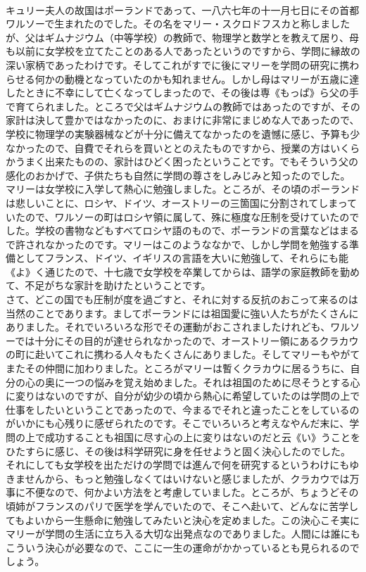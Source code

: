 \documentclass[8pt]{extreport}
\begin{document}
\begin{CJK}{UTF8}{min}
\\	キュリー夫人の故国はポーランドであって、一八六七年の十一月七日にその首都ワルソーで生まれたのでした。その名をマリー・スクロドフスカと称しましたが、父はギムナジウム（中等学校）の教師で、物理学と数学とを教えて居り、母も以前に女学校を立てたことのある人であったというのですから、学問に縁故の深い家柄であったわけです。そしてこれがすでに後にマリーを学問の研究に携わらせる何かの動機となっていたのかも知れません。しかし母はマリーが五歳に達したときに不幸にして亡くなってしまったので、その後は専《もっぱ》ら父の手で育てられました。ところで父はギムナジウムの教師ではあったのですが、その家計は決して豊かではなかったのに、おまけに非常にまじめな人であったので、学校に物理学の実験器械などが十分に備えてなかったのを遺憾に感じ、予算も少なかったので、自費でそれらを買いととのえたものですから、授業の方はいくらかうまく出来たものの、家計はひどく困ったということです。でもそういう父の感化のおかげで、子供たちも自然に学問の尊さをしみじみと知ったのでした。
\\	マリーは女学校に入学して熱心に勉強しました。ところが、その頃のポーランドは悲しいことに、ロシヤ、ドイツ、オーストリーの三箇国に分割されてしまっていたので、ワルソーの町はロシヤ領に属して、殊に極度な圧制を受けていたのでした。学校の書物などもすべてロシヤ語のもので、ポーランドの言葉などはまるで許されなかったのです。マリーはこのようななかで、しかし学問を勉強する準備としてフランス、ドイツ、イギリスの言語を大いに勉強して、それらにも能《よ》く通じたので、十七歳で女学校を卒業してからは、語学の家庭教師を勤めて、不足がちな家計を助けたということです。
\\	さて、どこの国でも圧制が度を過ごすと、それに対する反抗のおこって来るのは当然のことであります。ましてポーランドには祖国愛に強い人たちがたくさんにありました。それでいろいろな形でその運動がおこされましたけれども、ワルソーでは十分にその目的が達せられなかったので、オーストリー領にあるクラカウの町に赴いてこれに携わる人々もたくさんにありました。そしてマリーもやがてまたその仲間に加わりました。ところがマリーは暫くクラカウに居るうちに、自分の心の奥に一つの悩みを覚え始めました。それは祖国のために尽そうとする心に変りはないのですが、自分が幼少の頃から熱心に希望していたのは学問の上で仕事をしたいということであったので、今まるでそれと違ったことをしているのがいかにも心残りに感ぜられたのです。そこでいろいろと考えなやんだ末に、学問の上で成功することも祖国に尽す心の上に変りはないのだと云《い》うことをひたすらに感じ、その後は科学研究に身を任せようと固く決心したのでした。
\\	それにしても女学校を出ただけの学問では進んで何を研究するというわけにもゆきませんから、もっと勉強しなくてはいけないと感じましたが、クラカウでは万事に不便なので、何かよい方法をと考慮していました。ところが、ちょうどその頃姉がフランスのパリで医学を学んでいたので、そこへ赴いて、どんなに苦学してもよいから一生懸命に勉強してみたいと決心を定めました。この決心こそ実にマリーが学問の生活に立ち入る大切な出発点なのでありました。人間には誰にもこういう決心が必要なので、ここに一生の運命がかかっているとも見られるのでしょう。

\end{CJK}
\end{document}
